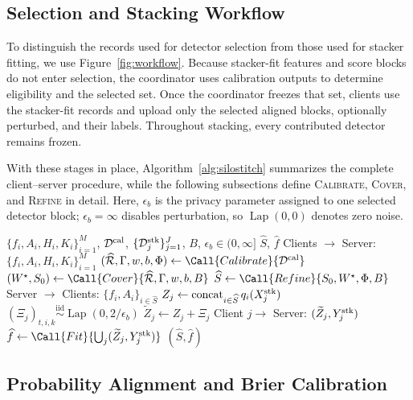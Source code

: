 \subsection{Selection and Stacking Workflow}

To distinguish the records used for detector selection from those used for
stacker fitting, we use Figure~\ref{fig:workflow}. Because stacker-fit features
and score blocks do not enter selection, the coordinator uses calibration
outputs to determine eligibility and the selected set. Once the coordinator
freezes that set, clients use the stacker-fit records and upload only the
selected aligned blocks, optionally perturbed, and their labels. Throughout
stacking, every contributed detector remains frozen.

With these stages in place, Algorithm~\ref{alg:silostitch} summarizes the
complete client--server procedure, while the following subsections define
\textsc{Calibrate}, \textsc{Cover}, and \textsc{Refine} in detail. Here,
$\epsilon_b$ is the privacy parameter assigned to one selected detector block;
$\epsilon_b=\infty$ disables perturbation, so $\operatorname{Lap}(0,0)$ denotes
zero noise.

\begin{algorithm}[t]
\caption{\Fname Client--Server Procedure}
\label{alg:silostitch}
\small
\begin{algorithmic}[1]
\Require $\{f_i,A_i,H_i,K_i\}_{i=1}^{M}$, $\mathcal D^{\rm cal}$,
$\{\mathcal D_j^{\rm stk}\}_{j=1}^{J}$, $B$, $\epsilon_b\in(0,\infty]$
\Ensure $\widehat S$, $\widehat f$
\State Clients $\to$ Server: $\{f_i,A_i,H_i,K_i\}_{i=1}^{M}$
\State $(\widehat{\mathcal R},\Gamma,w,b,\Phi)\gets
\Call{Calibrate}{\mathcal D^{\rm cal}}$
\State $(W^\star,S_0)\gets\Call{Cover}{\widehat{\mathcal R},\Gamma,w,b,B}$
\State $\widehat S\gets\Call{Refine}{S_0,W^\star,\Phi,B}$
\State Server $\to$ Clients: $\{f_i,A_i\}_{i\in\widehat S}$
    \State $Z_j\gets\operatorname{concat}_{i\in\widehat S}q_i(X_j^{\rm stk})$
    \State $(\Xi_j)_{t,i,k}\overset{\mathrm{iid}}{\sim}
    \operatorname{Lap}(0,2/\epsilon_b)$
    \State $\widetilde Z_j\gets Z_j+\Xi_j$
    \State Client $j\to$ Server: $(\widetilde Z_j,Y_j^{\rm stk})$
\EndFor
\State $\widehat f\gets\Call{Fit}{\bigcup_j(\widetilde Z_j,Y_j^{\rm stk})}$
\State \Return $(\widehat S,\widehat f)$
\end{algorithmic}
\end{algorithm}

\subsection{Probability Alignment and Brier Calibration}

